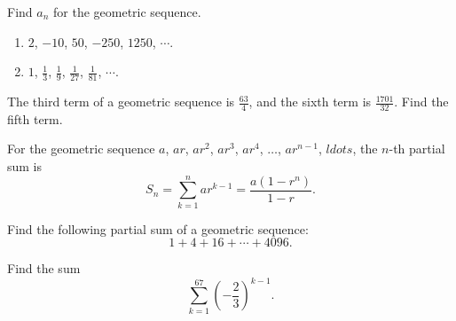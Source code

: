 \begin{example}
    Find $a_n$ for the geometric sequence.
    \begin{enumerate}
        \item $2$, $-10$, $50$, $-250$, $1250$, $\cdots$.
        \item $1$, $\frac{1}{3}$, $\frac{1}{9}$, $\frac{1}{27}$, $\frac{1}{81}$, $\cdots$.
    \end{enumerate}
\end{example}

\begin{example}
    The third term of a geometric sequence is $\frac{63}{4}$, and the sixth term is $\frac{1701}{32}$. Find the fifth term.
\end{example}
\vspace*{6\baselineskip}

\begin{theorem}
    For the geometric sequence $a$, $a r$, $a r^2$, $a r^3$, $a r^4$, $\dots$, $a r^{n-1}$, $ldots$, the $n$-th partial sum is
$$
S_n=\sum_{k=1}^n a r^{k-1}=\dfrac{a(1-r^n)}{1-r}.
$$
\end{theorem}

\begin{example}
    Find the following partial sum of a geometric sequence:
\[1+4+16+\cdots+4096.\]
\end{example}
\vspace*{6\baselineskip}

\begin{example}
    Find the sum 
    \[\sum\limits_{k=1}^67\left(-\frac23\right)^{k-1}.\]
\end{example}
\vspace*{6\baselineskip}

